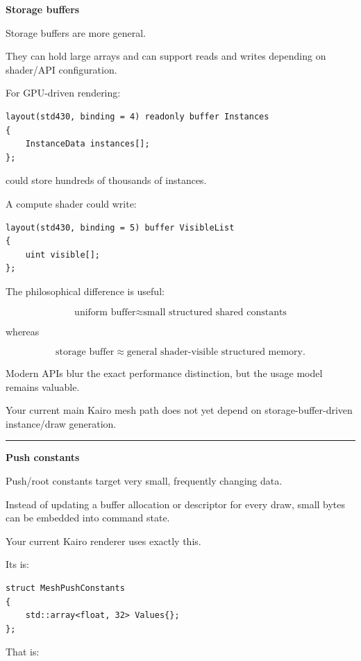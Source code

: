 \textbf{Storage buffers}

Storage buffers are more general.

They can hold large arrays and can support reads and writes depending on shader/API configuration.

For GPU-driven rendering:

\begin{verbatim}
layout(std430, binding = 4) readonly buffer Instances
{
    InstanceData instances[];
};
\end{verbatim}

could store hundreds of thousands of instances.

A compute shader could write:

\begin{verbatim}
layout(std430, binding = 5) buffer VisibleList
{
    uint visible[];
};
\end{verbatim}

The philosophical difference is useful:

\[
\text{uniform buffer}
\approx
\text{small structured shared constants}
\]

whereas

\[
\text{storage buffer}
\approx
\text{general shader-visible structured memory}.
\]

Modern APIs blur the exact performance distinction, but the usage model remains valuable.

Your current main Kairo mesh path does not yet depend on storage-buffer-driven instance/draw generation.

\begin{center}\rule{0.5\linewidth}{0.5pt}\end{center}

\textbf{Push constants}

Push/root constants target very small, frequently changing data.

Instead of updating a buffer allocation or descriptor for every draw, small bytes can be embedded into command state.

Your current Kairo renderer uses exactly this.

Its  is:

\begin{verbatim}
struct MeshPushConstants
{
    std::array<float, 32> Values{};
};
\end{verbatim}

That is:

